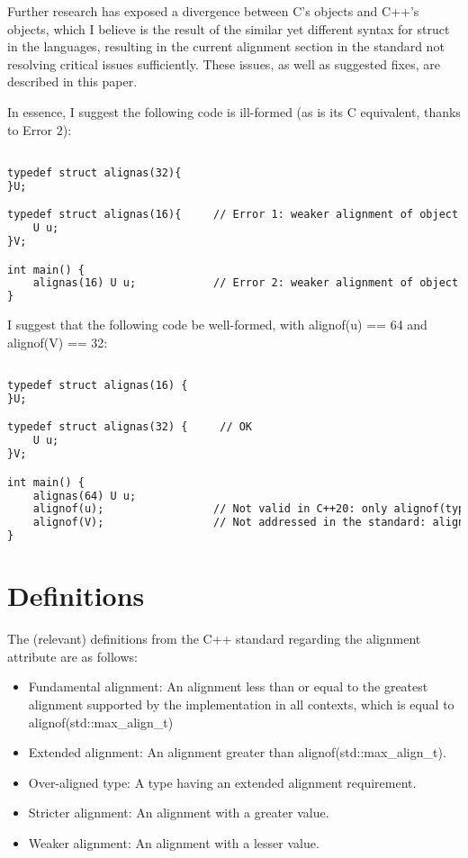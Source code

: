 \documentclass[11pt]{article}
\begin{document}
Further research has exposed a divergence between C's objects and C++'s objects, which I believe is the result of the similar yet different syntax for struct in the languages, resulting in the current alignment section in the standard not resolving critical issues sufficiently. These issues, as well as suggested fixes, are described in this paper.

In essence, I suggest the following code is ill-formed (as is its C equivalent, thanks to Error 2):
\begin{lstlisting}[language=diff]

typedef struct alignas(32){
}U; 

typedef struct alignas(16){     // Error 1: weaker alignment of object than its members' alignment
    U u;
}V; 

int main() {
    alignas(16) U u;            // Error 2: weaker alignment of object than the alignment of its type
}
\end{lstlisting}

I suggest that the following code be well-formed, with alignof(u) == 64 and alignof(V) == 32:

\begin{lstlisting}[language=diff]

typedef struct alignas(16) {
}U; 

typedef struct alignas(32) {     // OK
    U u;
}V; 

int main() {
    alignas(64) U u; 
    alignof(u);                 // Not valid in C++20: only alignof(type) is allowed. 
    alignof(V);                 // Not addressed in the standard: alignment of type with aligned members.
}
\end{lstlisting}

\section{Definitions} 
The (relevant) definitions from the C++ standard regarding the alignment attribute are as follows:

\begin{itemize}

    \item Fundamental alignment: An alignment less than or equal to the greatest alignment supported by the implementation in all contexts, which is equal to alignof(std::max\_align\_t)

    \item Extended alignment: An alignment greater than alignof(std::max\_align\_t). 
    \item Over-aligned type: A type having an extended alignment requirement.
    \item Stricter alignment: An alignment with a greater value.
    \item Weaker alignment: An alignment with a lesser value.
    
\end{itemize}
\end{document}

